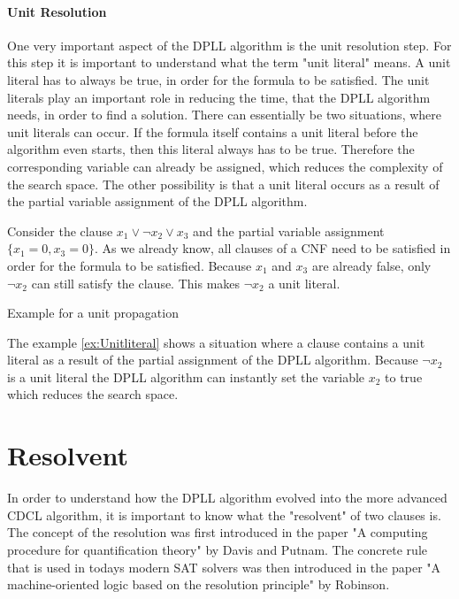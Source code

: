 \paragraph{Unit Resolution}
One very important aspect of the DPLL algorithm is the unit resolution step. For this step it is important to understand what the term "unit literal" means. A unit literal has to always be true, in order for the formula to be satisfied. The unit literals play an important role in reducing the time, that the DPLL algorithm needs, in order to find a solution. There can essentially be two situations, where unit literals can occur. If the formula itself contains a unit literal before the algorithm even starts, then this literal always has to be true. Therefore the corresponding variable can already be assigned, which reduces the complexity of the search space. The other possibility is that a unit literal occurs as a result of the partial variable assignment of the DPLL algorithm.

\begin{example}
\begin{leftbar}
Consider the clause $x_1 \vee \neg x_2 \vee x_3$ and the partial variable assignment $\{x_1=0,x_3=0\}$. As we already know, all clauses of a CNF need to be satisfied in order for the formula to be satisfied. Because $x_1$ and $x_3$ are already false, only $\neg x_2$ can still satisfy the clause. This makes $\neg x_2$ a unit literal.
\end{leftbar}
\caption{Example for a unit propagation}
\label{ex:Unitliteral}
\end{example}

The example \ref{ex:Unitliteral} shows a situation where a clause contains a unit literal as a result of the partial assignment of the DPLL algorithm. Because $\neg x_2$ is a unit literal the DPLL algorithm can instantly set the variable $x_2$ to true which reduces the search space.

\section{Resolvent}
In order to understand how the DPLL algorithm evolved into the more advanced CDCL algorithm, it is important to know what the "resolvent" of two clauses is. The concept of the resolution was first introduced in the paper "A computing procedure for quantification theory" \cite{davis1960computing} by Davis and Putnam. The concrete rule that is used in todays modern SAT solvers was then introduced in the paper "A machine-oriented logic based on the resolution principle" \cite{robinson1965machine} by Robinson.

